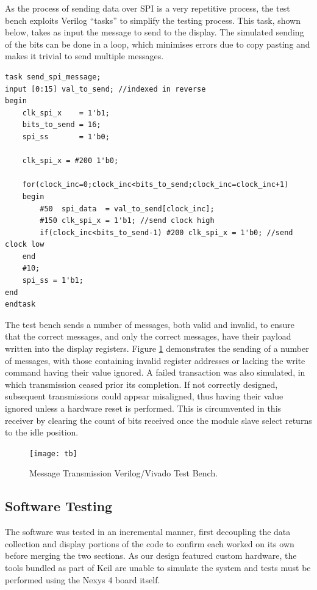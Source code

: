 \documentclass[11pt,british]{report}
\begin{document}
As the process of sending data over SPI is a very repetitive process, the test bench exploits Verilog ``tasks'' to simplify the testing process. This task, shown below, takes as input the message to send to the display. The simulated sending of the bits can be done in a loop, which minimises errors due to copy pasting and makes it trivial to send multiple messages.
\begin{lstlisting}[style={verilog-style}]
task send_spi_message;
input [0:15] val_to_send; //indexed in reverse
begin
    clk_spi_x    = 1'b1;
    bits_to_send = 16;
    spi_ss       = 1'b0;
    
    clk_spi_x = #200 1'b0;
    
    for(clock_inc=0;clock_inc<bits_to_send;clock_inc=clock_inc+1)
    begin
        #50  spi_data  = val_to_send[clock_inc];
        #150 clk_spi_x = 1'b1; //send clock high
        if(clock_inc<bits_to_send-1) #200 clk_spi_x = 1'b0; //send clock low
    end
    #10;
    spi_ss = 1'b1;        
end
endtask
\end{lstlisting}
The test bench sends a number of messages, both valid and invalid, to ensure that the correct messages, and only the correct messages, have their payload written into the display registers. Figure \ref{fig:TB} demonstrates the sending of a number of messages, with those containing invalid register addresses or lacking the write command having their value ignored. A failed transaction was also simulated, in which transmission ceased prior its completion. If not correctly designed, subsequent transmissions could appear misaligned, thus having their value ignored unless a hardware reset is performed. This is circumvented in this receiver by clearing the count of bits received once the module slave select returns to the idle position. 
\begin{figure}[h]
	\centering
	\texttt{[image: tb]}
	\caption{Message Transmission Verilog/Vivado Test Bench.}
	\label{fig:TB}
\end{figure}

\subsection*{Software Testing}
The software was tested in an incremental manner, first decoupling the data collection and display portions of the code to confirm each worked on its own before merging the two sections. As our design featured custom hardware, the tools bundled as part of Keil are unable to simulate the system and tests must be performed using the Nexys 4 board itself.
\end{document}
